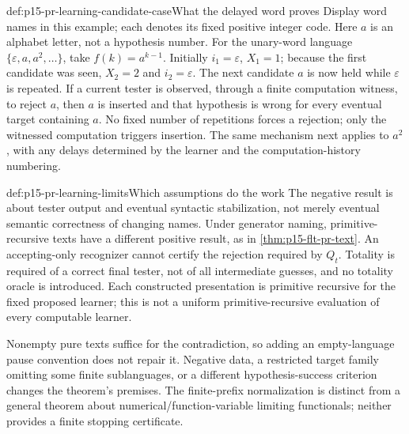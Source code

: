 \begin{hbexample}{def:p15-pr-learning-candidate-case}{What the delayed word proves}
Display word names in this example; each denotes its fixed positive
integer code. Here \(a\) is an alphabet letter, not a hypothesis number.
For the unary-word language \(\{\varepsilon,a,a^2,\ldots\}\),
take \(f(k)=a^{k-1}\). Initially \(i_1=\varepsilon\), \(X_1=1\);
because the first candidate was seen, \(X_2=2\) and
\(i_2=\varepsilon\). The next candidate \(a\) is now held while
\(\varepsilon\) is repeated. If a current tester is observed,
through a finite computation witness, to reject \(a\), then \(a\)
is inserted and that hypothesis is wrong for every eventual
target containing \(a\). No fixed number of repetitions forces
a rejection; only the witnessed computation triggers insertion.
The same mechanism next applies to \(a^2\), with any delays
determined by the learner and the computation-history numbering.
\end{hbexample}

\begin{proofboundary}{def:p15-pr-learning-limits}{Which assumptions do the work}
The negative result is about tester output and eventual syntactic
stabilization, not merely eventual semantic correctness of changing
names. Under generator naming, primitive-recursive texts have a
different positive result, as in \cref{thm:p15-flt-pr-text}.
An accepting-only recognizer cannot certify the rejection required
by \(Q_t\). Totality is required of a correct final tester, not of
all intermediate guesses, and no totality oracle is introduced.
Each constructed presentation is primitive recursive for the fixed
proposed learner; this is not a uniform primitive-recursive
evaluation of every computable learner.

Nonempty pure texts suffice for the contradiction, so adding an
empty-language pause convention does not repair it.
Negative data, a restricted target family omitting some finite
sublanguages, or a different hypothesis-success criterion changes
the theorem's premises. The finite-prefix normalization is distinct
from a general theorem about numerical/function-variable limiting
functionals; neither provides a finite stopping certificate.
\end{proofboundary}

